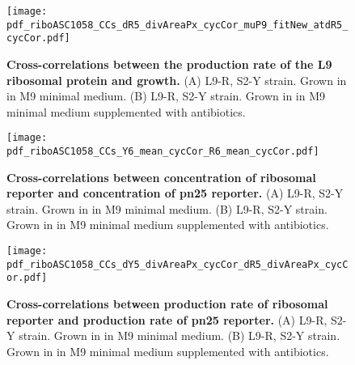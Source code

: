 \begin{figure}
    \centering
    \texttt{[image: pdf\_riboASC1058\_CCs\_dR5\_divAreaPx\_cycCor\_muP9\_fitNew\_atdR5\_cycCor.pdf]}
    \caption{ 
        \textbf{Cross-correlations between the production rate of the L9 ribosomal protein and growth.}
        (A) L9-R, S2-Y strain. Grown in in M9 minimal medium.
        (B) L9-R, S2-Y strain. Grown in in M9 minimal medium supplemented with antibiotics. 
%
    }
    \label{fig:ribo:CCsPmuY}
\end{figure}



\begin{figure}
    \centering
    \texttt{[image: pdf\_riboASC1058\_CCs\_Y6\_mean\_cycCor\_R6\_mean\_cycCor.pdf]}
    \caption{ 
        \textbf{Cross-correlations between concentration of ribosomal reporter and concentration of pn25 reporter.}
        (A) L9-R, S2-Y strain. Grown in in M9 minimal medium.
(B) L9-R, S2-Y strain. Grown in in M9 minimal medium supplemented with antibiotics.
    }
    \label{fig:ribo:CCsEmuY}
\end{figure}

\begin{figure}
    \centering
    \texttt{[image: pdf\_riboASC1058\_CCs\_dY5\_divAreaPx\_cycCor\_dR5\_divAreaPx\_cycCor.pdf]}
    \caption{ 
        \textbf{Cross-correlations between production rate of ribosomal reporter and production rate of pn25 reporter.}
        (A) L9-R, S2-Y strain. Grown in in M9 minimal medium.
(B) L9-R, S2-Y strain. Grown in in M9 minimal medium supplemented with antibiotics.
    }
    \label{fig:ribo:CCsPmuY}
\end{figure}





